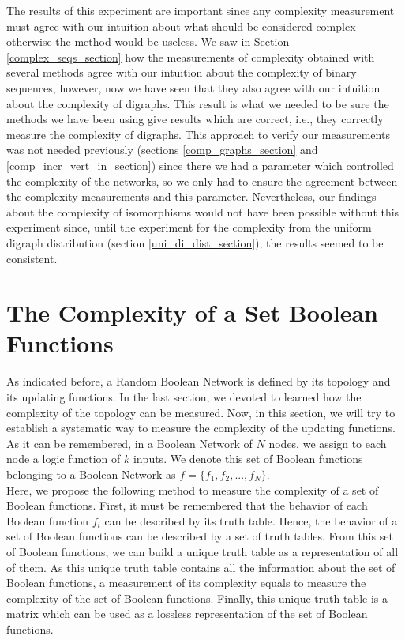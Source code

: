 The results of this experiment are important since any complexity measurement must agree with our intuition about what should be considered complex otherwise the method would be useless. We saw in Section \ref{complex_seqs_section} how the measurements of complexity obtained with several methods agree with our intuition about the complexity of binary sequences, however, now we have seen that they also agree with our intuition about the complexity of digraphs. This result is what we needed to be sure the methods we have been using give results which are correct, i.e., they correctly measure the complexity of digraphs. This approach to verify our measurements was not needed previously (sections \ref{comp_graphs_section} and \ref{comp_incr_vert_in_section}) since there we had a parameter which controlled the complexity of the networks, so we only had to ensure the agreement between the complexity measurements and this parameter. Nevertheless, our findings about the complexity of isomorphisms would not have been possible without this experiment since, until the experiment for the complexity from the uniform digraph distribution (section \ref{uni_di_dist_section}), the results seemed to be consistent.

\section{The Complexity of a Set Boolean Functions}
As indicated before, a Random Boolean Network is defined by its topology and its updating functions. In the last section, we devoted to learned how the complexity of the topology can be measured. Now, in this section, we will try to establish a systematic way to measure the complexity of the updating functions.\\

As it can be remembered, in a Boolean Network of $N$ nodes, we assign to each node a logic function of $k$ inputs. We denote this set of Boolean functions belonging to a Boolean Network as $f= \{ f_{1},f_{2},...,f_{N} \}$.\\

Here, we propose the following method to measure the complexity of a set of Boolean functions. First, it must be remembered that the behavior of each Boolean function $f_{i}$ can be described by its truth table. Hence, the behavior of a set of Boolean functions can be described by a set of truth tables. From this set of Boolean functions, we can build a unique truth table as a representation of all of them. As this unique truth table contains all the information about the set of Boolean functions, a measurement of its complexity equals to measure the complexity of the set of Boolean functions. Finally, this unique truth table is a matrix which can be used as a lossless representation of the set of Boolean functions.\\

